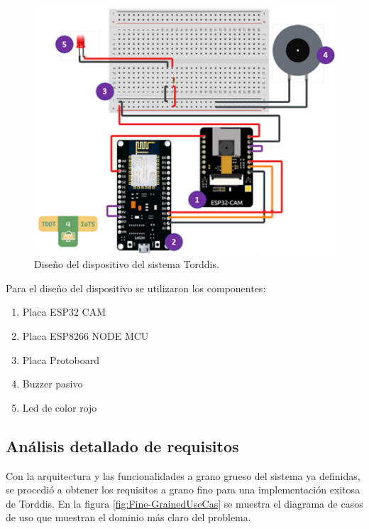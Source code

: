 \documentclass[a4paper,fleqn]{cas-sc}
\begin{document}
			\begin{figure}[hbt!]
				\centering
				\includegraphics[frame,scale=0.5, width=\linewidth]{figs/Figure_6}
				\caption{Diseño del dispositivo del sistema Torddis. \label{fig:TorddisDevice}}
			\end{figure} 
			
			Para el diseño del dispositivo se utilizaron los componentes:
			\begin{enumerate}
				\item Placa ESP32 CAM
				\item Placa ESP8266 NODE MCU
				\item Placa Protoboard
				\item Buzzer pasivo
				\item Led de color rojo
			\end{enumerate}
		\subsection{Análisis detallado de requisitos}
			Con la arquitectura y las funcionalidades a grano grueso del sistema ya definidas, se procedió a obtener los requisitos a grano fino para una implementación exitosa de Torddis. En la figura \ref{fig:Fine-GrainedUseCas} se muestra el diagrama de casos de uso que muestran el dominio más claro del problema.
	
\end{document}
